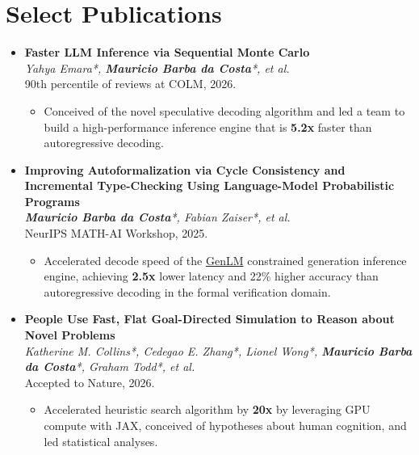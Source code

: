 \documentclass[letterpaper,10pt]{article} %
\newcommand{\CVItem}[1]{
  \item\small{
    {#1 \vspace{-3pt}}
  }
}
\begin{document}
\section{Select Publications}
  \begin{itemize}[leftmargin=0.5cm, label={}]
    \item \textbf{Faster LLM Inference via Sequential Monte Carlo} \\
      \small{\emph{Yahya Emara*, \textbf{Mauricio Barba da Costa}*, et al.}} \\
      \small{90th percentile of reviews at COLM, 2026.}
      \begin{itemize}[topsep=-4pt]
        \CVItem{Conceived of the novel speculative decoding algorithm and led a team to build a high-performance inference engine that is \textbf{5.2x} faster than autoregressive decoding.}
      \end{itemize}
    \item \textbf{Improving Autoformalization via Cycle Consistency and Incremental Type-Checking Using Language-Model Probabilistic Programs} \\
      \small{\emph{\textbf{Mauricio Barba da Costa}*, Fabian Zaiser*, et al.}} \\
      \small{NeurIPS MATH-AI Workshop, 2025.}
      \begin{itemize}[topsep=-4pt]
        \CVItem{Accelerated decode speed of the \href{https://github.com/genlm/genlm-control}{GenLM} constrained generation inference engine, achieving \textbf{2.5x} lower latency and 22\% higher accuracy than autoregressive decoding in the formal verification domain.}
      \end{itemize}
    \item \textbf{People Use Fast, Flat Goal-Directed Simulation to Reason about Novel Problems} \\
      \small{\emph{Katherine M. Collins*, Cedegao E. Zhang*, Lionel Wong*, \textbf{Mauricio Barba da Costa}*, Graham Todd*, et al.}} \\
      \small{Accepted to Nature, 2026.}
      \begin{itemize}[topsep=-4pt]
        \CVItem{Accelerated heuristic search algorithm by \textbf{20x} by leveraging GPU compute with JAX, conceived of hypotheses about human cognition, and led statistical analyses.}
      \end{itemize}
  \end{itemize}
\end{document}
